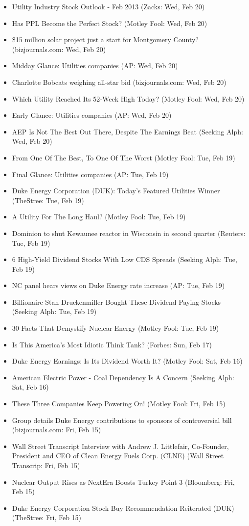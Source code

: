 \documentclass[11pt,asymmetric]{article}
\begin{document}
\begin{itemize}
\item Utility Industry Stock Outlook - Feb 2013 (Zacks: Wed, Feb 20)
\item Has PPL Become the Perfect Stock? (Motley Fool: Wed, Feb 20)
\item \$15 million solar project just a start for Montgomery County? (bizjournals.com: Wed, Feb 20)
\item Midday Glance: Utilities companies (AP: Wed, Feb 20)
\item Charlotte Bobcats weighing all-star bid (bizjournals.com: Wed, Feb 20)
\item Which Utility Reached Its 52-Week High Today? (Motley Fool: Wed, Feb 20)
\item Early Glance: Utilities companies (AP: Wed, Feb 20)
\item AEP Is Not The Best Out There, Despite The Earnings Beat (Seeking Alph: Wed, Feb 20)
\item From One Of The Best, To One Of The Worst (Motley Fool: Tue, Feb 19)
\item Final Glance: Utilities companies (AP: Tue, Feb 19)
\item Duke Energy Corporation (DUK): Today's Featured Utilities Winner (TheStree: Tue, Feb 19)
\item A Utility For The Long Haul? (Motley Fool: Tue, Feb 19)
\item Dominion to shut Kewaunee reactor in Wisconsin in second quarter (Reuters: Tue, Feb 19)
\item 6 High-Yield Dividend Stocks With Low CDS Spreads (Seeking Alph: Tue, Feb 19)
\item NC panel hears views on Duke Energy rate increase (AP: Tue, Feb 19)
\item Billionaire Stan Druckenmiller Bought These Dividend-Paying Stocks (Seeking Alph: Tue, Feb 19)
\item 30 Facts That Demystify Nuclear Energy (Motley Fool: Tue, Feb 19)
\item Is This America's Most Idiotic Think Tank? (Forbes: Sun, Feb 17)
\item Duke Energy Earnings: Is Its Dividend Worth It? (Motley Fool: Sat, Feb 16)
\item American Electric Power - Coal Dependency Is A Concern (Seeking Alph: Sat, Feb 16)
\item These Three Companies Keep Powering On! (Motley Fool: Fri, Feb 15)
\item Group details Duke Energy contributions to sponsors of controversial bill (bizjournals.com: Fri, Feb 15)
\item Wall Street Transcript Interview with Andrew J. Littlefair, Co-Founder, President and CEO of Clean Energy Fuels Corp. (CLNE) (Wall Street Transcrip: Fri, Feb 15)
\item Nuclear Output Rises as NextEra Boosts Turkey Point 3 (Bloomberg: Fri, Feb 15)
\item Duke Energy Corporation Stock Buy Recommendation Reiterated (DUK) (TheStree: Fri, Feb 15)
\end{itemize}
\end{document}
